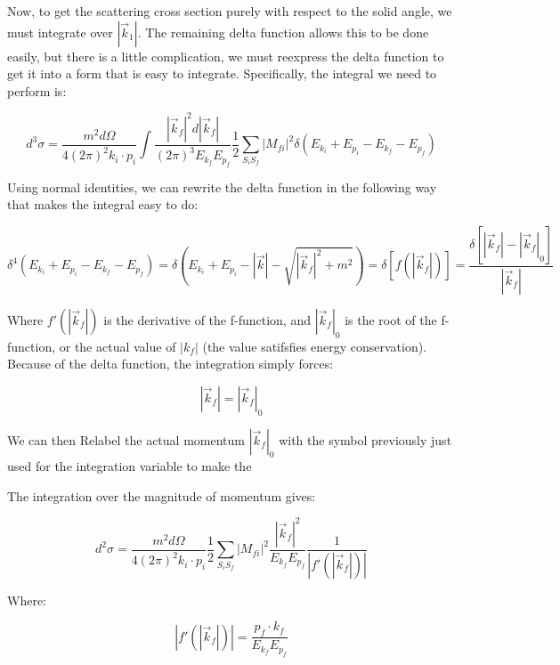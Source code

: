 \documentclass[a4]{article}
\begin{document}
    Now, to get the scattering cross section purely with respect to the solid angle, we must integrate over $|\vec{k}_1|$. The remaining delta function
    allows this to be done easily, but there is a little complication, we must reexpress the delta function to get it into a form that is easy to integrate.
    Specifically, the integral we need to perform is:

    \begin{equation}
        d^3 \sigma = \frac{m^2 d\Omega}{4 (2 \pi)^2 k_i \cdot p_i} \int \frac{|\vec{k}_f|^2 d|\vec{k}_f|}{(2 \pi)^3 E_{k_f} E_{p_f}} \frac{1}{2} \sum_{S_i S_f} |M_{fi}|^2 \delta (E_{k_i} + E_{p_i} - E_{k_f} - E_{p_f})
    \end{equation}

    Using normal identities, we can rewrite the delta function in the following way that makes the integral easy to do:

    \begin{equation}
        \delta^4 (E_{k_i} + E_{p_i} - E_{k_f} - E_{p_f}) = \delta (E_{k_i} + E_{p_i} - |\vec{k}| - \sqrt{|\vec{k}_f|^2 + m^2}) = \delta[f(|\vec{k}_f|)] = \frac{\delta[|\vec{k}_f| - |\vec{k}_f|_0]}{|\vec{k}_f|}
    \end{equation}

    Where $f'(|\vec{k}_f|)$ is the derivative of the f-function, and $|\vec{k}_f|_0$ is the root of the f-function, or the actual value of $|k_f|$ (the value
    satifsfies energy conservation). Because of the delta function, the integration simply forces:

    \begin{equation}
        |\vec{k}_f| = |\vec{k}_f|_0
    \end{equation}

    We can then Relabel the actual momentum $|\vec{k}_f|_0$ with the symbol previously just used for the integration variable to make the 


    The integration over the magnitude of momentum gives:

    \begin{equation}
        d^2 \sigma = \frac{m^2 d \Omega}{4 (2 \pi)^2 k_i \cdot p_i} \frac{1}{2} \sum_{S_i S_f} |M_{fi}|^2 \frac{|\vec{k}_f|^2}{E_{k_f} E_{p_f}} \frac{1}{|f'(|\vec{k}_f|)|}
    \end{equation}

    Where:

    \begin{equation}
        |f'(|\vec{k}_f|)| = \frac{p_f \cdot k_f}{E_{k_f} E_{p_f}}
    \end{equation}
\end{document}
